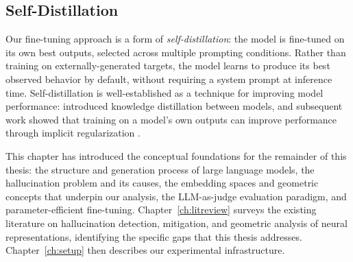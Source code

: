 \subsection{Self-Distillation}
\label{sec:bg-distillation}

Our fine-tuning approach is a form of \emph{self-distillation}: the model is fine-tuned on its own best outputs, selected across multiple prompting conditions. Rather than training on externally-generated targets, the model learns to produce its best observed behavior by default, without requiring a system prompt at inference time. Self-distillation is well-established as a technique for improving model performance: \citet{hinton2015distilling} introduced knowledge distillation between models, and subsequent work showed that training on a model's own outputs can improve performance through implicit regularization \citep{furlanello2018born}.

This chapter has introduced the conceptual foundations for the remainder of this thesis: the structure and generation process of large language models, the hallucination problem and its causes, the embedding spaces and geometric concepts that underpin our analysis, the LLM-as-judge evaluation paradigm, and parameter-efficient fine-tuning. Chapter~\ref{ch:litreview} surveys the existing literature on hallucination detection, mitigation, and geometric analysis of neural representations, identifying the specific gaps that this thesis addresses. Chapter~\ref{ch:setup} then describes our experimental infrastructure.
